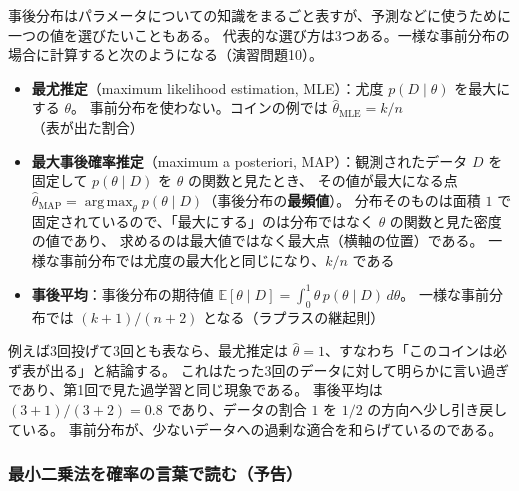 事後分布はパラメータについての知識をまるごと表すが、予測などに使うために一つの値を選びたいこともある。
代表的な選び方は3つある。一様な事前分布の場合に計算すると次のようになる（演習問題10）。
\begin{itemize}
  \item \textbf{最尤推定}（maximum likelihood estimation, MLE）：尤度 $p(D \mid \theta)$ を最大にする $\theta$。
    事前分布を使わない。コインの例では $\hat{\theta}_{\mathrm{MLE}} = k/n$（表が出た割合）
  \item \textbf{最大事後確率推定}（maximum a posteriori, MAP）：観測されたデータ $D$ を固定して $p(\theta \mid D)$ を $\theta$ の関数と見たとき、
    その値が最大になる点 $\hat{\theta}_{\mathrm{MAP}} = \operatorname*{arg\,max}_{\theta} p(\theta \mid D)$（事後分布の\textbf{最頻値}）。
    分布そのものは面積 $1$ で固定されているので、「最大にする」のは分布ではなく $\theta$ の関数と見た密度の値であり、
    求めるのは最大値ではなく最大点（横軸の位置）である。
    一様な事前分布では尤度の最大化と同じになり、$k/n$ である
  \item \textbf{事後平均}：事後分布の期待値 $\mathbb{E}[\theta \mid D] = \int_0^1 \theta\,p(\theta \mid D)\,d\theta$。
    一様な事前分布では $(k + 1)/(n + 2)$ となる（ラプラスの継起則）
\end{itemize}
例えば3回投げて3回とも表なら、最尤推定は $\hat{\theta} = 1$、すなわち「このコインは必ず表が出る」と結論する。
これはたった3回のデータに対して明らかに言い過ぎであり、第1回で見た過学習と同じ現象である。
事後平均は $(3 + 1)/(3 + 2) = 0.8$ であり、データの割合 $1$ を $1/2$ の方向へ少し引き戻している。
事前分布が、少ないデータへの過剰な適合を和らげているのである。

\subsubsection{最小二乗法を確率の言葉で読む（予告）}

